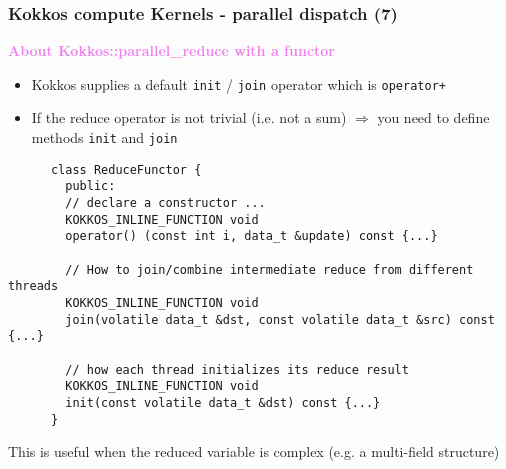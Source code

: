 \begin{frame}[fragile=singleslide]
  \frametitle{Kokkos compute Kernels - parallel dispatch (7)}

  {\large \textcolor{violet}{\textbf{About Kokkos::parallel\_reduce with a functor}}}

  \begin{itemize}
  \item Kokkos supplies a default \texttt{init} / \texttt{join} operator which is \texttt{operator+}
  \item If the reduce operator is not trivial (i.e. not a sum) $\Rightarrow$ you need to define methods \texttt{init} and \texttt{join}
  \end{itemize}

  {\footnotesize
    \begin{verbatim}
      class ReduceFunctor {
        public:
        // declare a constructor ...
        KOKKOS_INLINE_FUNCTION void
        operator() (const int i, data_t &update) const {...}

        // How to join/combine intermediate reduce from different threads
        KOKKOS_INLINE_FUNCTION void
        join(volatile data_t &dst, const volatile data_t &src) const {...}

        // how each thread initializes its reduce result
        KOKKOS_INLINE_FUNCTION void
        init(const volatile data_t &dst) const {...}
      }
      \end{verbatim}
      This is useful when the reduced variable is complex (e.g. a multi-field structure)
    }
\end{frame}

